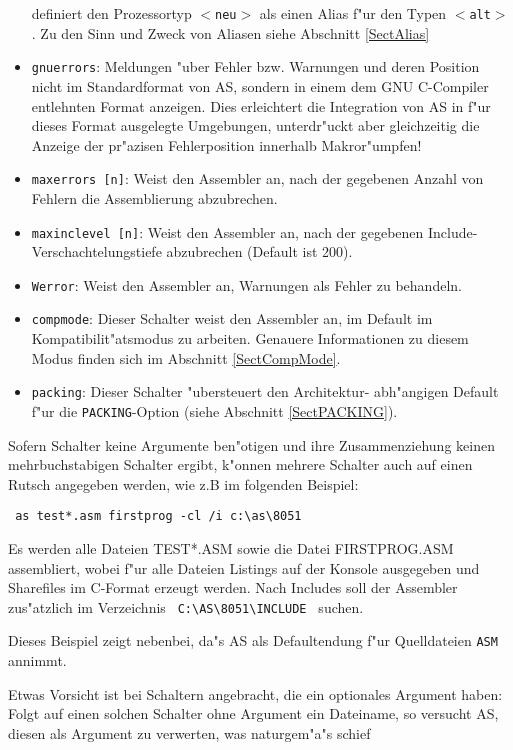 \documentclass[12pt,a4paper,twoside]{report}
\newcommand{\tty}[1]{{\tt #1}}
\begin{document}
\begin{itemize}
{      definiert den Prozessortyp \tty{$<$neu$>$} als einen Alias f"ur den
      Typen \tty{$<$alt$>$}.  Zu den Sinn und Zweck von Aliasen siehe
      Abschnitt \ref{SectAlias}}
\item{{\tt gnuerrors}: Meldungen "uber Fehler bzw. Warnungen und deren
      Position nicht im Standardformat von AS, sondern in einem dem GNU
      C-Compiler entlehnten Format anzeigen.  Dies erleichtert die
      Integration von AS in f"ur dieses Format ausgelegte Umgebungen,
      unterdr"uckt aber gleichzeitig die Anzeige der pr"azisen
      Fehlerposition innerhalb Makror"umpfen!}
\item{{\tt maxerrors [n]}: Weist den Assembler an, nach der gegebenen
      Anzahl von Fehlern die Assemblierung abzubrechen.}
\item{{\tt maxinclevel [n]}: Weist den Assembler an, nach der gegebenen
      Include-Verschachtelungstiefe abzubrechen (Default ist 200).}
\item{{\tt Werror}: Weist den Assembler an, Warnungen als Fehler zu
      behandeln.}
\item{\tty{compmode}: Dieser Schalter weist den Assembler an, im Default
      im Kompatibilit"atsmodus zu arbeiten.  Genauere Informationen zu
      diesem Modus finden sich im Abschnitt \ref{SectCompMode}.}
\item{\tty{packing}: Dieser Schalter "ubersteuert den Architektur-
      abh"angigen Default f"ur die {\tt PACKING}-Option (siehe
      Abschnitt \ref{SectPACKING}).}
\end{itemize}
Sofern Schalter keine Argumente ben"otigen und ihre Zusammenziehung
keinen mehrbuchstabigen Schalter ergibt, k"onnen mehrere Schalter
auch auf einen Rutsch angegeben werden, wie z.B im folgenden Beispiel:
\begin{verbatim}
 as test*.asm firstprog -cl /i c:\as\8051
\end{verbatim}
Es werden alle Dateien TEST*.ASM sowie die Datei FIRSTPROG.ASM
assembliert, wobei f"ur alle Dateien Listings auf der Konsole
ausgegeben und Sharefiles im C-Format erzeugt werden.  Nach Includes
soll der Assembler zus"atzlich im Verzeichnis \verb! C:\AS\8051\INCLUDE !
suchen.
\par
Dieses Beispiel zeigt nebenbei, da"s AS als Defaultendung f"ur Quelldateien
\tty{ASM} annimmt.
\par
Etwas Vorsicht ist bei Schaltern angebracht, die ein optionales Argument
haben: Folgt auf einen solchen Schalter ohne Argument ein Dateiname, so
versucht AS, diesen als Argument zu verwerten, was naturgem"a"s schief
\end{document}
